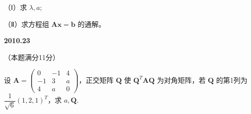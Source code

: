 \documentclass[UTF8,12pt,fontset=windows]{ctexart}
\begin{document}
（Ⅰ）求 $\lambda, a$;

（Ⅱ）求方程组 $\boldsymbol{Ax} = \boldsymbol{b}$ 的通解。

\vfill
\newpage
{\large\bfseries 2010.23}

（本题满分11分）

设 $\boldsymbol{A} = \begin{pmatrix} 0 & -1 & 4 \\ -1 & 3 & a \\ 4 & a & 0 \end{pmatrix}$，正交矩阵 $\boldsymbol{Q}$ 使 $\boldsymbol{Q}^T\boldsymbol{AQ}$ 为对角矩阵，若 $\boldsymbol{Q}$ 的第1列为 $\dfrac{1}{\sqrt{6}}(1, 2, 1)^T$，求 $a, \boldsymbol{Q}$.

\vfill
\end{document}
